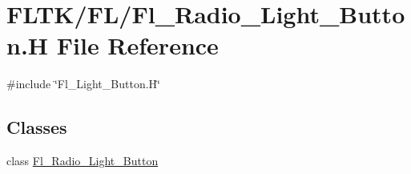 \hypertarget{_fl___radio___light___button_8_h}{}\section{F\+L\+T\+K/\+F\+L/\+Fl\+\_\+\+Radio\+\_\+\+Light\+\_\+\+Button.H File Reference}
\label{_fl___radio___light___button_8_h}
{\ttfamily \#include \char`\"{}Fl\+\_\+\+Light\+\_\+\+Button.\+H\char`\"{}}\newline
\subsection*{Classes}
\begin{DoxyCompactItemize}
\item 
class \hyperlink{class_fl___radio___light___button}{Fl\+\_\+\+Radio\+\_\+\+Light\+\_\+\+Button}
\end{DoxyCompactItemize}
